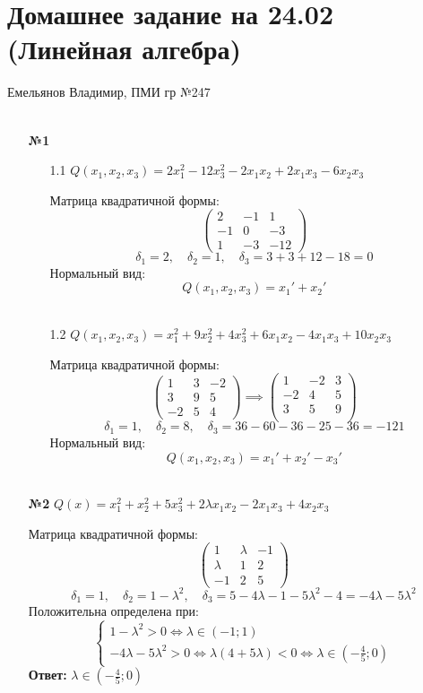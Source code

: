 \documentclass[a4paper]{article}
\newcommand{\mat}[1]{\begin{pmatrix} #1 \end{pmatrix}}
\renewcommand{\f}[2]{\frac{#1}{#2}}
\newcommand{\case}[1]{\begin{cases} #1 \end{cases}}
\newcommand{\lr}{\Leftrightarrow}
\begin{document}
\section*{Домашнее задание на 24.02 (Линейная алгебра)}
 {\large Емельянов Владимир, ПМИ гр №247}\\\\
\begin{enumerate}
    \item[\textbf{№1}]
    \begin{enumerate}
        \item[1.1]$Q(x_1, x_2, x_3) = 2x_1^2 - 12x_3^2 - 2x_1x_2 + 2x_1x_3 - 6x_2x_3 $

        Матрица квадратичной формы:
        $$\mat{
            2 & -1 & 1 \\
            -1 & 0 & -3\\
            1 & -3 & -12
        }$$
        $$\delta_1 = 2, \quad \delta_2 = 1, \quad \delta_3 = 3+3+12-18 = 0$$
        Нормальный вид:
        $$Q(x_1, x_2, x_3) = x_1' + x_2'$$\\

        \item[1.2]$ Q(x_1, x_2, x_3) = x_1^2 + 9x_2^2 + 4x_3^2 + 6x_1x_2 - 4x_1x_3 + 10x_2x_3 $
        
        Матрица квадратичной формы:
        $$\mat{
            1 & 3 & -2 \\
            3 & 9 & 5\\
            -2& 5 & 4   
        } \implies \mat{
            1 & -2& 3 \\
            -2& 4& 5   \\
            3 & 5& 9 \\
        }$$
        $$\delta_1 = 1, \quad \delta_2 = 8, \quad \delta_3 = 36-60-36-25-36 = -121$$
        Нормальный вид:
        $$Q(x_1, x_2, x_3) = x_1' + x_2' -x_3'$$\\
    \end{enumerate}

    \item[\textbf{№2}]$Q(x) = x_1^2 + x_2^2 + 5x_3^2 + 2\lambda x_1x_2 - 2x_1x_3 + 4x_2x_3$
    
    Матрица квадратичной формы:
    $$\mat{
        1 & \lambda & -1 \\
        \lambda & 1 & 2\\
        -1 & 2 & 5
    }$$
    $$\delta_1 = 1, \quad \delta_2 = 1-\lambda^2, \quad \delta_3 = 5 -4\lambda-1-5\lambda^2-4 = -4\lambda - 5\lambda^2$$
    Положительна определена при:
    $$\case{
        1-\lambda^2 > 0 \lr \lambda \in (-1; 1)\\
        -4\lambda-5\lambda^2 > 0 \lr \lambda(4+5\lambda) < 0 \lr \lambda \in (-\f{4}{5};0)
    }$$
    \textbf{Ответ: } $\lambda \in (-\f{4}{5};0)$


\end{enumerate}
\end{document}
